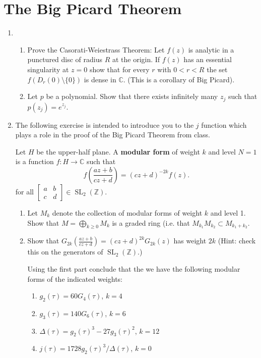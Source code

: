\documentclass[a4paper,10pt]{article}
\newcommand{\ZZ}{\mathbb{Z}}
\newcommand{\CC}{\mathbb{C}}
\newcommand{\SL}{\operatorname{SL}}
\begin{document}
\section{The Big Picard Theorem}

\begin{enumerate}	
	\item 
	\begin{enumerate}
		\item Prove the Casorati-Weiestrass Theorem: Let $f(z)$ is analytic in a punctured disc of radius $R$ at the origin. If $f(z)$ has an essential singularity at $z=0$ show that for every $r$ with $0<r<R$ the set $f(D_r(0)\setminus \lbrace 0 \rbrace)$ is dense in $\CC$. (This is a corollary of Big Picard).
		\item Let $p$ be a polynomial. Show that there exists infinitely many $z_j$ such that $p(z_j) = e^{z_j}$.
	\end{enumerate}
	
	\item 
	The following exercise is intended to introduce you to the $j$ function which plays a role in the proof of the Big Picard Theorem from class. 
	
	Let $H$ be the upper-half plane. 
	A \textbf{modular form} of weight $k$ and level $N=1$ is a function $f:H \to \CC$ such that  
	\begin{equation}
	f( \frac{az+b}{cz+d} ) = (cz+d)^{-2k} f(z).
	\end{equation}
	for all $\left[\begin{matrix}
	a & b \\
	c & d 
	\end{matrix} \right ]\in \SL_2(\ZZ)$. 
	
	\begin{enumerate}
		\item Let $M_k$ denote the collection of modular forms of weight $k$ and level 1. 
		Show that $M = \bigoplus_{k\geq 0} M_k$ is a graded ring (i.e. that $M_{k_1}M_{k_2} \subset M_{k_1+k_2}$. 
		
		\item Show that $G_{2k}(\frac{az+b}{cz+d}) = (cz + d)^{2k} G_{2k}(z)$ has weight $2k$ (Hint: check this on the generators of $\SL_2(\ZZ)$.)
		
		Using the first part conclude that the we have the following modular forms of the indicated weights:
		\begin{enumerate}
			\item $g_2(\tau) = 60 G_4(\tau)$, $k=4$
			\item $g_3(\tau) = 140 G_6(\tau)$, $k=6$
			\item $\Delta(\tau) = g_2(\tau)^3 - 27 g_3(\tau)^2$, $k=12$
			\item $j(\tau) = 1728 g_2(\tau)^3/\Delta(\tau)$, $k=0$
		\end{enumerate}
	\end{enumerate}
	

\end{enumerate}
\end{document}

